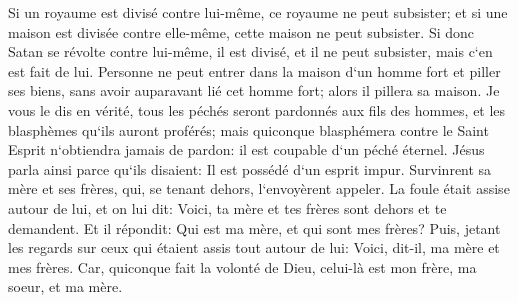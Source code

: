 \verse Si un royaume est divisé contre lui-même, ce royaume ne peut subsister; 
\verse et si une maison est divisée contre elle-même, cette maison ne peut subsister. 
\verse Si donc Satan se révolte contre lui-même, il est divisé, et il ne peut subsister, mais c`en est fait de lui. 
\verse Personne ne peut entrer dans la maison d`un homme fort et piller ses biens, sans avoir auparavant lié cet homme fort; alors il pillera sa maison. 
\verse Je vous le dis en vérité, tous les péchés seront pardonnés aux fils des hommes, et les blasphèmes qu`ils auront proférés; 
\verse mais quiconque blasphémera contre le Saint Esprit n`obtiendra jamais de pardon: il est coupable d`un péché éternel. 
\verse Jésus parla ainsi parce qu`ils disaient: Il est possédé d`un esprit impur. 
\verse Survinrent sa mère et ses frères, qui, se tenant dehors, l`envoyèrent appeler. 
\verse La foule était assise autour de lui, et on lui dit: Voici, ta mère et tes frères sont dehors et te demandent. 
\verse Et il répondit: Qui est ma mère, et qui sont mes frères? 
\verse Puis, jetant les regards sur ceux qui étaient assis tout autour de lui: Voici, dit-il, ma mère et mes frères. 
\verse Car, quiconque fait la volonté de Dieu, celui-là est mon frère, ma soeur, et ma mère. 

\chapter{}

